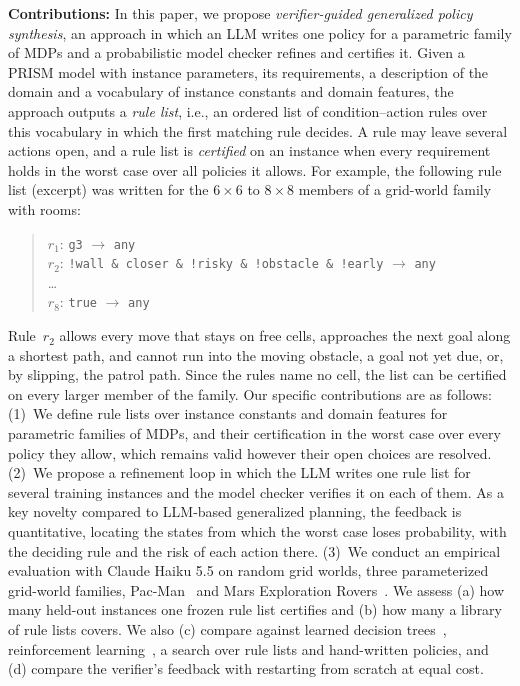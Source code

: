 \textbf{Contributions:}
In this paper, we propose \textit{verifier-guided generalized policy synthesis}, an approach in which an LLM writes one policy for a parametric family of MDPs and a probabilistic model checker refines and certifies it.
Given a PRISM model with instance parameters, its requirements, a description of the domain and a vocabulary of instance constants and domain features, the approach outputs a \textit{rule list}, i.e., an ordered list of condition--action rules over this vocabulary in which the first matching rule decides.
A rule may leave several actions open, and a rule list is \textit{certified} on an instance when every requirement holds in the worst case over all policies it allows.
For example, the following rule list (excerpt) was written for the $6 \times 6$ to $8 \times 8$ members of a grid-world family with rooms:
\begin{quote}
\small
$r_1$: \texttt{g3} $\rightarrow$ \texttt{any}\\
$r_2$: \texttt{!wall \& closer \& !risky \& !obstacle \& !early} $\rightarrow$ \texttt{any}\\
\ldots\\
$r_8$: \texttt{true} $\rightarrow$ \texttt{any}
\end{quote}
Rule~$r_2$ allows every move that stays on free cells, approaches the next goal along a shortest path, and cannot run into the moving obstacle, a goal not yet due, or, by slipping, the patrol path.
Since the rules name no cell, the list can be certified on every larger member of the family.
Our specific contributions are as follows:
(1)~We define rule lists over instance constants and domain features for parametric families of MDPs, and their certification in the worst case over every policy they allow, which remains valid however their open choices are resolved.
(2)~We propose a refinement loop in which the LLM writes one rule list for several training instances and the model checker verifies it on each of them.
As a key novelty compared to LLM-based generalized planning, the feedback is quantitative, locating the states from which the worst case loses probability, with the deciding rule and the risk of each action there.
(3)~We conduct an empirical evaluation with Claude Haiku 5.5 on random grid worlds, three parameterized grid-world families, Pac-Man~\cite{TODO-QVBS} and Mars Exploration Rovers~\cite{TODO-MER-model}.
We assess (a) how many held-out instances one frozen rule list certifies and (b) how many a library of rule lists covers.
We also (c) compare against learned decision trees~\cite{TODO-1-2-3-Go-VMCAI25}, reinforcement learning~\cite{TODO-PPO}, a search over rule lists and hand-written policies, and (d) compare the verifier's feedback with restarting from scratch at equal cost.

